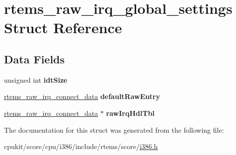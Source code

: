 \hypertarget{structrtems__raw__irq__global__settings}{}\section{rtems\+\_\+raw\+\_\+irq\+\_\+global\+\_\+settings Struct Reference}
\label{structrtems__raw__irq__global__settings}
\subsection*{Data Fields}
\begin{DoxyCompactItemize}
\item 
\mbox{\label{structrtems__raw__irq__global__settings_ab837ea85be198cb9ba92cb3775205c55}} 
unsigned int {\bfseries idt\+Size}
\item 
\mbox{\label{structrtems__raw__irq__global__settings_ae93dcb9c1fee1cd7b8bb5eaea51f9c0f}} 
\mbox{\hyperlink{struct____rtems__raw__irq__connect__data____}{rtems\+\_\+raw\+\_\+irq\+\_\+connect\+\_\+data}} {\bfseries default\+Raw\+Entry}
\item 
\mbox{\label{structrtems__raw__irq__global__settings_ad9cf7a52453f179fbe7518dc0ac630b5}} 
\mbox{\hyperlink{struct____rtems__raw__irq__connect__data____}{rtems\+\_\+raw\+\_\+irq\+\_\+connect\+\_\+data}} $\ast$ {\bfseries raw\+Irq\+Hdl\+Tbl}
\end{DoxyCompactItemize}


The documentation for this struct was generated from the following file\+:\begin{DoxyCompactItemize}
\item 
cpukit/score/cpu/i386/include/rtems/score/\mbox{\hyperlink{i386_8h}{i386.\+h}}\end{DoxyCompactItemize}
